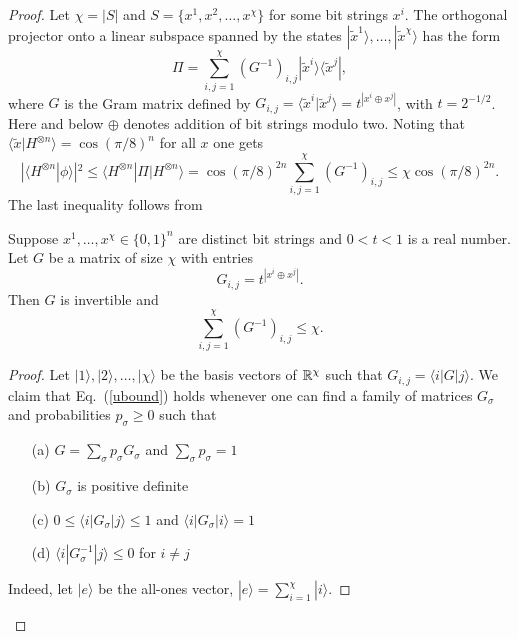 \begin{proof}
Let $\chi=|S|$ and $S=\{x^1,x^2,\ldots,x^\chi\}$ for some bit strings $x^i$.
The orthogonal projector onto a linear subspace spanned by
the states $|\tilde{x}^1\rangle,\ldots,|\tilde{x}^\chi\rangle$ has the form
\begin{equation}
\label{eq2}
\Pi=\sum_{i,j=1}^\chi (G^{-1})_{i,j} |\tilde{x}^i\rangle\langle \tilde{x}^j|,
\end{equation}
where $G$ is the Gram matrix defined by
$G_{i,j}=\langle \tilde{x}^i | \tilde{x}^j\rangle = t^{|x^i \oplus x^j|}$,
with $t=2^{-1/2}$. Here and below $\oplus$ denotes addition of bit strings
modulo two.
Noting that $\langle\tilde{x}|H^{\otimes n}\rangle = \cos{(\pi/8)}^{n}$ for all $x$ one gets
\begin{equation}
\label{eq3}
|\langle H^{\otimes n}|\phi\rangle |^2 \le \langle H^{\otimes n} |\Pi|H^{\otimes n}\rangle
=\cos{(\pi/8)}^{2n} \sum_{i,j=1}^\chi (G^{-1})_{i,j}
\le \chi \cos{(\pi/8)}^{2n}.
\end{equation}
The last inequality follows from 
\begin{lemma}
Suppose $x^1,\ldots,x^\chi \in \{0,1\}^n$ are distinct bit strings
and $0<t < 1$ is a real number. 
Let $G$ be a matrix of size $\chi$ with entries
\begin{equation}
\label{Gt}
G_{i,j}=t^{|x^i \oplus x^j|}.
\end{equation}
Then $G$ is invertible and 
\begin{equation}
\label{ubound}
\sum_{i,j=1}^\chi (G^{-1})_{i,j} \le \chi.
\end{equation}
\end{lemma}
\begin{proof}
Let $|1\rangle,|2\rangle,\ldots,|\chi\rangle$ be the basis vectors of $\mathbb{R}^\chi$
such that $G_{i,j}= \langle i|G|j\rangle$.
We claim that Eq.~(\ref{ubound}) holds whenever one can 
find a family of matrices $G_\sigma$ and probabilities $p_\sigma\ge 0$ such that
\begin{enumerate}
\item[(a)] $G=\sum_\sigma p_\sigma G_\sigma$ and $\sum_\sigma p_\sigma=1$
\item[(b)] $G_\sigma$ is positive definite 
\item[(c)] $0\le \langle i|G_\sigma|j\rangle \le 1$
and $\langle i|G_\sigma|i\rangle=1$ 
\item[(d)]  $\langle i|G_\sigma^{-1}|j\rangle \le 0$ for $i\ne j$ 
\end{enumerate}
Indeed, let $|e\rangle$ be the  all-ones vector, $|e\rangle=\sum_{i=1}^\chi |i\rangle$.

\end{proof}
\end{proof}
